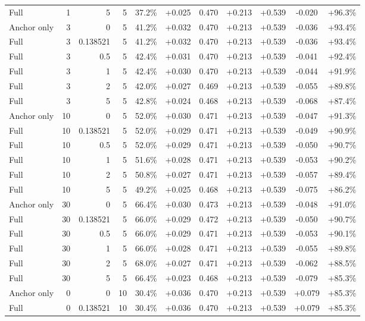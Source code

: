 \begin{table}[htbp]
\begin{tabular}{lrrrccccccc}
Full & 1 & 5 & 5 & 37.2\% & +0.025 & 0.470 & +0.213 & +0.539 & -0.020 & +96.3\% \\
Anchor only & 3 & 0 & 5 & 41.2\% & +0.032 & 0.470 & +0.213 & +0.539 & -0.036 & +93.4\% \\
Full & 3 & 0.138521 & 5 & 41.2\% & +0.032 & 0.470 & +0.213 & +0.539 & -0.036 & +93.4\% \\
Full & 3 & 0.5 & 5 & 42.4\% & +0.031 & 0.470 & +0.213 & +0.539 & -0.041 & +92.4\% \\
Full & 3 & 1 & 5 & 42.4\% & +0.030 & 0.470 & +0.213 & +0.539 & -0.044 & +91.9\% \\
Full & 3 & 2 & 5 & 42.0\% & +0.027 & 0.469 & +0.213 & +0.539 & -0.055 & +89.8\% \\
Full & 3 & 5 & 5 & 42.8\% & +0.024 & 0.468 & +0.213 & +0.539 & -0.068 & +87.4\% \\
Anchor only & 10 & 0 & 5 & 52.0\% & +0.030 & 0.471 & +0.213 & +0.539 & -0.047 & +91.3\% \\
Full & 10 & 0.138521 & 5 & 52.0\% & +0.029 & 0.471 & +0.213 & +0.539 & -0.049 & +90.9\% \\
Full & 10 & 0.5 & 5 & 52.0\% & +0.029 & 0.471 & +0.213 & +0.539 & -0.050 & +90.7\% \\
Full & 10 & 1 & 5 & 51.6\% & +0.028 & 0.471 & +0.213 & +0.539 & -0.053 & +90.2\% \\
Full & 10 & 2 & 5 & 50.8\% & +0.027 & 0.471 & +0.213 & +0.539 & -0.057 & +89.4\% \\
Full & 10 & 5 & 5 & 49.2\% & +0.025 & 0.468 & +0.213 & +0.539 & -0.075 & +86.2\% \\
Anchor only & 30 & 0 & 5 & 66.4\% & +0.030 & 0.473 & +0.213 & +0.539 & -0.048 & +91.0\% \\
Full & 30 & 0.138521 & 5 & 66.0\% & +0.029 & 0.472 & +0.213 & +0.539 & -0.050 & +90.7\% \\
Full & 30 & 0.5 & 5 & 66.0\% & +0.029 & 0.471 & +0.213 & +0.539 & -0.053 & +90.1\% \\
Full & 30 & 1 & 5 & 66.0\% & +0.028 & 0.471 & +0.213 & +0.539 & -0.055 & +89.8\% \\
Full & 30 & 2 & 5 & 68.0\% & +0.027 & 0.471 & +0.213 & +0.539 & -0.062 & +88.5\% \\
Full & 30 & 5 & 5 & 66.4\% & +0.023 & 0.468 & +0.213 & +0.539 & -0.079 & +85.3\% \\
Anchor only & 0 & 0 & 10 & 30.4\% & +0.036 & 0.470 & +0.213 & +0.539 & +0.079 & +85.3\% \\
Full & 0 & 0.138521 & 10 & 30.4\% & +0.036 & 0.470 & +0.213 & +0.539 & +0.079 & +85.3\% \\

\end{tabular}
\end{table}
